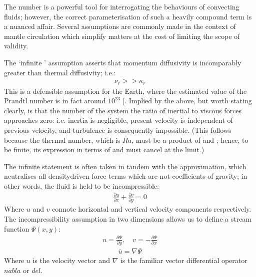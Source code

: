 \documentclass[letterpaper,10pt,english]{jupyterBook}
\begin{document}
\sphinxAtStartPar
The  number is a powerful tool for interrogating the behaviours of convecting fluids; however, the correct parameterisation of such a heavily compound term is a nuanced affair. Several assumptions are commonly made in the context of mantle circulation which simplify matters at the cost of limiting the scope of validity.

\sphinxAtStartPar
The ‘infinite ’ assumption asserts that momentum diffusivity is incomparably greater than thermal diffusivity; i.e.:
\begin{equation*}
\begin{split} \nu_r >> \kappa_r \end{split}
\end{equation*}
\sphinxAtStartPar
This is a defensible assumption for the Earth, where the estimated value of the Prandtl number is in fact around \(10^{23}\) {[}\sphinxcite{references:id89}{]}. Implied by the above, but worth stating clearly, is that the  number of the system \sphinxhyphen{} the ratio of inertial to viscous forces \sphinxhyphen{} approaches zero: i.e. inertia is negligible, present velocity is independent of previous velocity, and turbulence is consequently impossible. (This follows because the thermal  number, which is \(Ra\), must be a product of  and ; hence, to be finite, its expression in terms of  and  must cancel at the limit.)

\sphinxAtStartPar
The infinite  statement is often taken in tandem with the  approximation, which neutralises all density\sphinxhyphen{}driven force terms which are not coefficients of gravity; in other words, the fluid is held to be incompressible:
\begin{equation*}
\begin{split} \frac{\partial u}{\partial x} + \frac{\partial v}{\partial y} = 0 \end{split}
\end{equation*}
\sphinxAtStartPar
Where \(u\) and \(v\) connote horizontal and vertical velocity components respectively. The incompressibility assumption in two dimensions allows us to define a stream function \(\Psi(x, y)\):
\begin{equation*}
\begin{split} u = \frac{\partial \Psi}{\partial y}, \quad v = -\frac{\partial \Psi}{\partial x} \end{split}
\end{equation*}\begin{equation*}
\begin{split} \overline{u} = \nabla \Psi \end{split}
\end{equation*}
\sphinxAtStartPar
Where \(u\) is the velocity vector and \(\nabla\) is the familiar vector differential operator \(nabla\) or \(del\).
\end{document}
